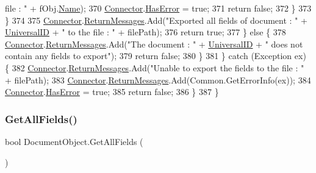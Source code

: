 \begin{DoxyCode}
{       file : "} + fObj.\mbox{\hyperlink{class_file_object_a9d47aff166393cb47490da2661576d62}{Name}});
370                         \mbox{\hyperlink{class_connector}{Connector}}.\mbox{\hyperlink{class_connector_a9365777a6b7b711b75bcfa6c4d53e989}{HasError}} = \textcolor{keyword}{true};
371                         \textcolor{keywordflow}{return} \textcolor{keyword}{false};
372                     \}
373                 \}
374 
375                 \mbox{\hyperlink{class_connector}{Connector}}.\mbox{\hyperlink{class_connector_a1ed422674b344524fd77998dcf6a9ba6}{ReturnMessages}}.Add(\textcolor{stringliteral}{"Exported all fields of document : "} + 
      \mbox{\hyperlink{class_document_object_a8b96d04632a2802e7cc5466ca5cee8cf}{UniversalID}} + \textcolor{stringliteral}{" to the file : "} + filePath);
376                 \textcolor{keywordflow}{return} \textcolor{keyword}{true};
377             \} \textcolor{keywordflow}{else} \{
378                 \mbox{\hyperlink{class_connector}{Connector}}.\mbox{\hyperlink{class_connector_a1ed422674b344524fd77998dcf6a9ba6}{ReturnMessages}}.Add(\textcolor{stringliteral}{"The document : "} + 
      \mbox{\hyperlink{class_document_object_a8b96d04632a2802e7cc5466ca5cee8cf}{UniversalID}} + \textcolor{stringliteral}{" does not contain any fields to export"});
379                 \textcolor{keywordflow}{return} \textcolor{keyword}{false};
380             \}
381         \} \textcolor{keywordflow}{catch} (Exception ex) \{
382             \mbox{\hyperlink{class_connector}{Connector}}.\mbox{\hyperlink{class_connector_a1ed422674b344524fd77998dcf6a9ba6}{ReturnMessages}}.Add(\textcolor{stringliteral}{"Unable to export the fields to the file : 
      "} + filePath);
383             \mbox{\hyperlink{class_connector}{Connector}}.\mbox{\hyperlink{class_connector_a1ed422674b344524fd77998dcf6a9ba6}{ReturnMessages}}.Add(Common.GetErrorInfo(ex));
384             \mbox{\hyperlink{class_connector}{Connector}}.\mbox{\hyperlink{class_connector_a9365777a6b7b711b75bcfa6c4d53e989}{HasError}} = \textcolor{keyword}{true};
385             \textcolor{keywordflow}{return} \textcolor{keyword}{false};
386         \}
387     \}
\end{DoxyCode}
\mbox{\label{class_document_object_a5e070c7c0a45ac06422ee992c841e780}} 
\subsubsection{\texorpdfstring{Get\+All\+Fields()}{GetAllFields()}}
{\footnotesize\ttfamily bool Document\+Object.\+Get\+All\+Fields (\begin{DoxyParamCaption}{ }\end{DoxyParamCaption})}



